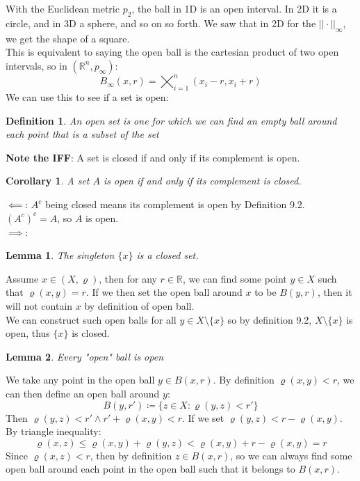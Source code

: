 \documentclass{article}
\newtheorem{lem}{Lemma}[section]
\newtheorem{defn}{Definition}[section]
\newtheorem{cor}{Corollary}[section]
\begin{document}
With the Euclidean metric $p_2$, the ball in 1D is an open interval. In 2D it is a circle, and in 3D a sphere, and so on so forth. We saw that in 2D for the $||\cdot||_\infty$, we get the shape of a square.\\

This is equivalent to saying the open ball is the cartesian product of two open intervals, so in $(\mathbb{R}^n, p_\infty)$:
\begin{equation*}
    B_\infty(x, r) = \bigtimes_{i = 1}^{n}(x_i - r, x_i + r)
\end{equation*}
We can use this to see if a set is open:
\begin{defn}
An open set is one for which we can find an empty ball around each point that is a subset of the set
\end{defn}
\textbf{Note the IFF}: A set is closed if and only if its complement is open.\\

\begin{cor}
A set $A$ is open if and only if its complement is closed.
\end{cor}
$\impliedby$: $A^c$ being closed means its complement is open by Definition 9.2. $(A^c)^c = A$, so $A$ is open.\\

$\implies$:

\begin{lem}
The singleton $\{x\}$ is a closed set.
\end{lem}
Assume $x \in (X, \varrho)$, then for any $r \in \mathbb{R}$, we can find some point $y \in X$ such that $\varrho(x, y) = r$. If we then set the open ball around $x$ to be $B(y, r)$, then it will not contain $x$ by definition of open ball.\\

We can construct such open balls for all $y \in X \setminus \{x\}$ so by definition 9.2, $X \setminus \{x\}$ is open, thus $\{x\}$ is closed.\\

\begin{lem}
Every "open" ball is open
\end{lem}
We take any point in the open ball $y \in B(x, r)$. By definition $\varrho(x, y) < r$, we can then define an open ball around $y$:
\begin{equation*}
    B(y, r') \coloneq \{z \in X: \varrho(y, z) < r'\}
\end{equation*}
Then $\varrho(y, z) < r' \land r' + \varrho(x, y) < r$. If we set $\varrho(y, z) < r - \varrho(x, y)$. By triangle inequality:
\begin{equation*}
    \varrho(x, z) \leqslant \varrho(x, y) + \varrho(y, z) < \varrho(x, y) + r - \varrho(x, y) = r
\end{equation*}
Since $\varrho(x, z) < r$, then by definition $z \in B(x, r)$, so we can always find some open ball around each point in the open ball such that it belongs to $B(x, r)$.\\
\end{document}
